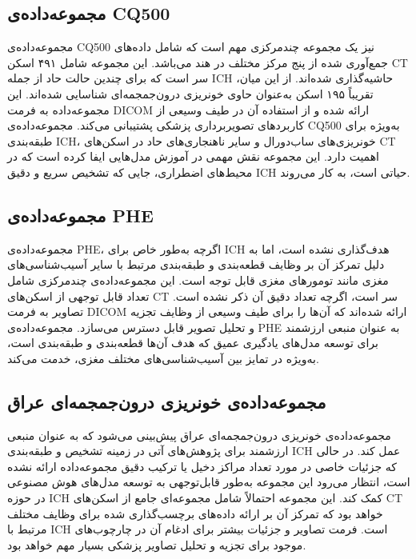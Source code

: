 \subsection{مجموعه‌داده‌ی CQ500}
مجموعه‌داده‌ی CQ500 نیز یک مجموعه چندمرکزی مهم است که شامل داده‌های جمع‌آوری شده از پنج مرکز مختلف در هند می‌باشد. این مجموعه شامل ۴۹۱ اسکن CT سر است که برای چندین حالت حاد از جمله ICH حاشیه‌گذاری شده‌اند. از این میان، تقریباً ۱۹۵ اسکن به‌عنوان حاوی خونریزی درون‌جمجمه‌ای شناسایی شده‌اند. این مجموعه‌داده به فرمت DICOM ارائه شده و از استفاده آن در طیف وسیعی از کاربردهای تصویربرداری پزشکی پشتیبانی می‌کند. مجموعه‌داده‌ی CQ500 به‌ویژه برای طبقه‌بندی ICH، خونریزی‌های ساب‌دورال و سایر ناهنجاری‌های حاد در اسکن‌های CT اهمیت دارد. این مجموعه نقش مهمی در آموزش مدل‌هایی ایفا کرده است که در محیط‌های اضطراری، جایی که تشخیص سریع و دقیق ICH حیاتی است، به کار می‌روند.

\subsection{مجموعه‌داده‌ی PHE}
مجموعه‌داده‌ی PHE، اگرچه به‌طور خاص برای ICH هدف‌گذاری نشده است، اما به دلیل تمرکز آن بر وظایف قطعه‌بندی و طبقه‌بندی مرتبط با سایر آسیب‌شناسی‌های مغزی مانند تومورهای مغزی قابل توجه است. این مجموعه‌داده‌ی چندمرکزی شامل تعداد قابل توجهی از اسکن‌های CT سر است، اگرچه تعداد دقیق آن ذکر نشده است. تصاویر به فرمت DICOM ارائه شده‌اند که آن‌ها را برای طیف وسیعی از وظایف تجزیه و تحلیل تصویر قابل دسترس می‌سازد. مجموعه‌داده‌ی PHE به عنوان منبعی ارزشمند برای توسعه مدل‌های یادگیری عمیق که هدف آن‌ها قطعه‌بندی و طبقه‌بندی است، به‌ویژه در تمایز بین آسیب‌شناسی‌های مختلف مغزی، خدمت می‌کند.

\subsection{مجموعه‌داده‌ی خونریزی درون‌جمجمه‌ای عراق}
مجموعه‌داده‌ی خونریزی درون‌جمجمه‌ای عراق پیش‌بینی می‌شود که به عنوان منبعی ارزشمند برای پژوهش‌های آتی در زمینه تشخیص و طبقه‌بندی ICH عمل کند. در حالی که جزئیات خاصی در مورد تعداد مراکز دخیل یا ترکیب دقیق مجموعه‌داده ارائه نشده است، انتظار می‌رود این مجموعه به‌طور قابل‌توجهی به توسعه مدل‌های هوش مصنوعی در حوزه ICH کمک کند. این مجموعه احتمالاً شامل مجموعه‌ای جامع از اسکن‌های CT خواهد بود که تمرکز آن بر ارائه داده‌های برچسب‌گذاری شده برای وظایف مختلف مرتبط با ICH است. فرمت تصاویر و جزئیات بیشتر برای ادغام آن در چارچوب‌های موجود برای تجزیه و تحلیل تصاویر پزشکی بسیار مهم خواهد بود.





